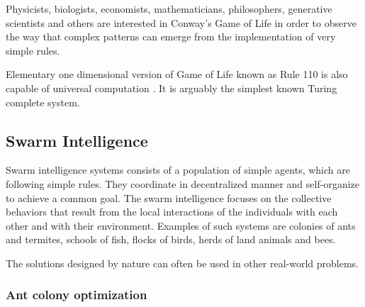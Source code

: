 Physicists, biologists, economists, mathematicians, philosophers, generative scientists and others are interested in Conway’s Game of Life in order to observe the way that complex patterns can emerge from the implementation of very simple rules.

Elementary one dimensional version of Game of Life known as Rule 110 is also capable of universal computation \cite{Cook04LifeOneDimensionalUniversal}. It is arguably the simplest known Turing complete system.


\subsection{Swarm Intelligence} %
\label{sub:swarm_intelligence}

Swarm intelligence  systems consists of a population of simple agents, which are following simple rules. They coordinate in decentralized manner and self-organize to achieve a common goal. The swarm intelligence focuses on the collective behaviors that result from the local interactions of the individuals with each other and with their environment. Examples of such systems are colonies of ants and termites, schools of fish, flocks of birds, herds of land animals and bees.

The solutions designed by nature can often be used in other real-world problems.

\subsubsection{Ant colony optimization} %
\label{ssub:ant_colony_optimization}

